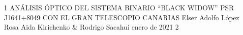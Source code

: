 \documentclass[letterpaper,12pt]{thesisECFM}
\theoremstyle{plain}
\theoremstyle{definition}
\theoremstyle{remark}
\begin{document}
\datosThesis%
{1}%
{ANÁLISIS ÓPTICO DEL  SISTEMA BINARIO “BLACK WIDOW” PSR J1641+8049	 CON EL GRAN TELESCOPIO CANARIAS}%
{Elser Adolfo L\'opez Rosa }%
{Aida Kirichenko  \& Rodrigo Sacahu\'i}%
{enero de 2021}		%
{2}							%






 
\end{document}

